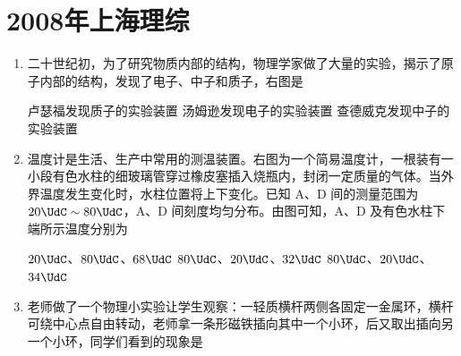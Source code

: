 \documentclass[\gkver]{gaokaozhenti}
\begin{document}
\chapter{2008年上海理综}

\begin{enumerate}
\item
二十世纪初，为了研究物质内部的结构，物理学家做了大量的实验，揭示了原子内部的结构，发现了电子、中子和质子，右图是


{卢瑟福发现质子的实验装置}
{汤姆逊发现电子的实验装置}
{查德威克发现中子的实验装置}


\item
温度计是生活、生产中常用的测温装置。右图为一个简易温度计，一根装有一小段有色水柱的细玻璃管穿过橡皮塞插入烧瓶内，封闭一定质量的气体。当外界温度发生变化时，水柱位置将上下变化。已知 A、D 间的测量范围为 $20\UdC\sim80\UdC$，A、D 间刻度均匀分布。由图可知，A、D 及有色水柱下端所示温度分别为


{$20\UdC$、$80\UdC$、$68\UdC$}
{$80\UdC$、$20\UdC$、$32\UdC$}
{$80\UdC$、$20\UdC$、$34\UdC$}


\item
老师做了一个物理小实验让学生观察：一轻质横杆两侧各固定一金属环，横杆可绕中心点自由转动，老师拿一条形磁铁插向其中一个小环，后又取出插向另一个小环，同学们看到的现象是


\end{enumerate}
\end{document}
